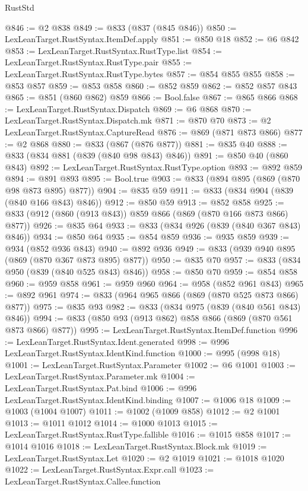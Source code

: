 \begin{lexlean}{RustStd}
\begin{coremodule}
{\begin{coremodule}
{{{{{{{{{{{{{{{{{{{{{{{{{{@846 := @2 @838
@849 := @833 (@837 (@845 @846))
@850 := LexLeanTarget.RustSyntax.ItemDef.apply
@851 := @850 @18
@852 := @6 @842
@853 := LexLeanTarget.RustSyntax.RustType.list
@854 := LexLeanTarget.RustSyntax.RustType.pair
@855 := LexLeanTarget.RustSyntax.RustType.bytes
@857 := @854 @855 @855
@858 := @853 @857
@859 := @853 @858
@860 := @852 @859
@862 := @852 @857 @843
@865 := @851 (@860 @862) @859
@866 := Bool.false
@867 := @865 @866
@868 := LexLeanTarget.RustSyntax.Dispatch
@869 := @6 @868
@870 := LexLeanTarget.RustSyntax.Dispatch.mk
@871 := @870 @70
@873 := @2 LexLeanTarget.RustSyntax.CaptureRead
@876 := @869 (@871 @873 @866)
@877 := @2 @868
@880 := @833 (@867 (@876 @877))
@881 := @835 @40
@888 := @833 (@834 @881 (@839 (@840 @98 @843) @846))
@891 := @850 @40 (@860 @843)
@892 := LexLeanTarget.RustSyntax.RustType.option
@893 := @892 @859
@894 := @891 @893
@895 := Bool.true
@903 := @833 (@894 @895 (@869 (@870 @98 @873 @895) @877))
@904 := @835 @59
@911 := @833 (@834 @904 (@839 (@840 @166 @843) @846))
@912 := @850 @59
@913 := @852 @858
@925 := @833 (@912 (@860 (@913 @843)) @859 @866 (@869 (@870 @166 @873 @866) @877))
@926 := @835 @64
@933 := @833 (@834 @926 (@839 (@840 @367 @843) @846))
@934 := @850 @64
@935 := @854 @859
@936 := @935 @859
@939 := @934 (@852 @936 @843)
@940 := @892 @936
@949 := @833 (@939 @940 @895 (@869 (@870 @367 @873 @895) @877))
@950 := @835 @70
@957 := @833 (@834 @950 (@839 (@840 @525 @843) @846))
@958 := @850 @70
@959 := @854 @858
@960 := @959 @858
@961 := @959 @960
@964 := @958 (@852 @961 @843)
@965 := @892 @961
@974 := @833 (@964 @965 @866 (@869 (@870 @525 @873 @866) @877))
@975 := @835 @93
@982 := @833 (@834 @975 (@839 (@840 @561 @843) @846))
@994 := @833 (@850 @93 (@913 @862) @858 @866 (@869 (@870 @561 @873 @866) @877))
@995 := LexLeanTarget.RustSyntax.ItemDef.function
@996 := LexLeanTarget.RustSyntax.Ident.generated
@998 := @996 LexLeanTarget.RustSyntax.IdentKind.function
@1000 := @995 (@998 @18)
@1001 := LexLeanTarget.RustSyntax.Parameter
@1002 := @6 @1001
@1003 := LexLeanTarget.RustSyntax.Parameter.mk
@1004 := LexLeanTarget.RustSyntax.Pat.bind
@1006 := @996 LexLeanTarget.RustSyntax.IdentKind.binding
@1007 := @1006 @18
@1009 := @1003 (@1004 @1007)
@1011 := @1002 (@1009 @858)
@1012 := @2 @1001
@1013 := @1011 @1012
@1014 := @1000 @1013
@1015 := LexLeanTarget.RustSyntax.RustType.fallible
@1016 := @1015 @858
@1017 := @1014 @1016
@1018 := LexLeanTarget.RustSyntax.Block.mk
@1019 := LexLeanTarget.RustSyntax.Let
@1020 := @2 @1019
@1021 := @1018 @1020
@1022 := LexLeanTarget.RustSyntax.Expr.call
@1023 := LexLeanTarget.RustSyntax.Callee.function
}}}}}}}}}}}}}}}}}}}}}}}}}}
\end{coremodule}}
\end{coremodule}
\end{lexlean}
